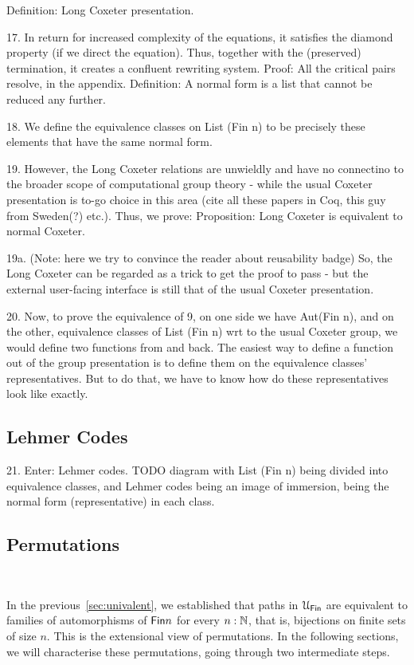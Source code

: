 Definition: Long Coxeter presentation.

17. In return for increased complexity of the equations, it satisfies the
diamond property (if we direct the equation). Thus, together with the
(preserved) termination, it creates a confluent rewriting system.
Proof: All the critical pairs resolve, in the appendix.
Definition: A normal form is a list that cannot be reduced any further.

18. We define the equivalence classes on List (Fin n) to be precisely these
elements that have the same normal form.

19. However, the Long Coxeter relations are unwieldly and have no
connectino to the broader scope of computational group theory - while the
usual Coxeter presentation is to-go choice in this area (cite all these
papers in Coq, this guy from Sweden(?) etc.).
Thus, we prove:
Proposition: Long Coxeter is equivalent to normal Coxeter.

19a. (Note: here we try to convince the reader about reusability badge) So,
the Long Coxeter can be regarded as a trick to get the proof to pass - but
the external user-facing interface is still that of the usual Coxeter
presentation.

20. Now, to prove the equivalence of 9, on one side we have Aut(Fin n), and
on the other, equivalence classes of List (Fin n) wrt to the usual Coxeter
group, we would define two functions from and back. The easiest way to
define a function out of the group presentation is to define them on the
equivalence classes' representatives. But to do that, we have to know how
do these representatives look like exactly.

\subsection{Lehmer Codes}

21. Enter: Lehmer codes.
TODO diagram with List (Fin n) being divided into equivalence classes, and
Lehmer codes being an image of immersion, being the normal form
(representative) in each class.

\subsection{Permutations}~\label{subsec:permutations}

In the previous~\cref{sec:univalent}, we established that paths in $\UFin$ are
equivalent to families of automorphisms of $\Fin{n}$ for every $n:\mathbb{N}$, that
is, bijections on finite sets of size $n$. This is the extensional view of
permutations. In the following sections, we will characterise these
permutations, going through two intermediate steps.

